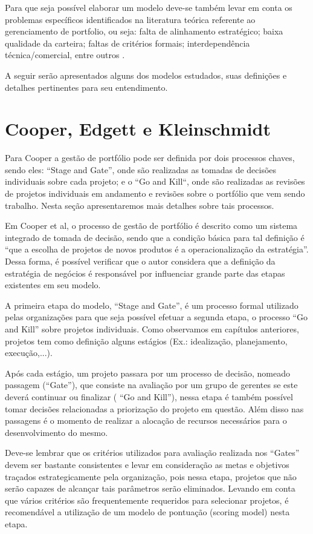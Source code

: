 \documentclass[12pt,a4paper,ruledheader,tocpage=prefix,floatnumber=continuous,pagestart=folhaderosto,font=times]{abnt}
\begin{document}
Para que seja possível elaborar um modelo deve-se também levar em conta os problemas específicos identificados na literatura teórica referente ao
gerenciamento de portfolio, ou seja: falta de alinhamento estratégico; baixa qualidade da carteira; faltas de critérios formais; interdependência 
técnica/comercial, entre outros \cite{martino1, martino2, cooper}.

A seguir serão apresentados alguns dos modelos estudados, suas definições e detalhes pertinentes para seu entendimento.

\section{Cooper, Edgett e Kleinschmidt}
Para Cooper a gestão de portfólio pode ser definida por dois processos chaves, sendo eles: ``Stage and Gate'', onde são realizadas as tomadas de 
decisões individuais sobre cada projeto; e o ``Go and Kill``, onde são realizadas as revisões de projetos individuais em andamento e revisões 
sobre o portfólio que vem sendo trabalho. Nesta seção apresentaremos mais detalhes sobre tais processos.

Em Cooper et al, o processo de gestão de portfólio é descrito como um sistema integrado de tomada de decisão, sendo que a condição básica para tal definição
é ``que a escolha de projetos de novos produtos é a operacionalização da estratégia''. Dessa forma, é possível verificar que o autor considera que a definição
da estratégia de negócios é responsável por influenciar grande parte das etapas existentes em seu modelo.

A primeira etapa do modelo, ``Stage and Gate'', é um processo formal utilizado pelas organizações para que seja possível efetuar a segunda etapa, o processo
``Go and Kill'' sobre projetos individuais. Como observamos em capítulos anteriores, projetos tem como definição alguns estágios (Ex.: idealização, planejamento,
execução,...). 

Após cada estágio, um projeto passara por um processo de decisão, nomeado passagem (``Gate''), que consiste na avaliação por um grupo de gerentes se este 
deverá continuar ou finalizar ( ``Go and Kill''), nessa etapa é também possível tomar decisões relacionadas a priorização do projeto em questão. Além disso
nas passagens é o momento de realizar a alocação de recursos necessários para o desenvolvimento do mesmo.

Deve-se lembrar que os critérios utilizados para avaliação realizada nos ``Gates'' devem ser bastante consistentes e levar em consideração as metas e objetivos
traçados estrategicamente pela organização, pois nessa etapa, projetos que não serão capazes de alcançar tais parâmetros serão eliminados. Levando em conta
que vários critérios são frequentemente requeridos para selecionar projetos, é recomendável a utilização de um modelo de pontuação (scoring model) nesta etapa.
\end{document}

